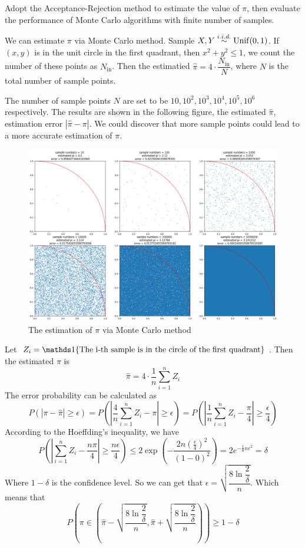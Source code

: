 \begin{homeworkProblem}

Adopt the Acceptance-Rejection method to estimate the value of $\pi$, then evaluate the performance of Monte Carlo algorithms with finite number of samples.

\solution

We can estimate $\pi$ via Monte Carlo method. Sample $X, Y\stackrel{i.i.d.}{\sim}\operatorname{Unif}(0,1)$. If $(x,y)$ is in the unit circle in the first quadrant, then $x^2+y^2\leq 1$, we count the number of these points as $N_{\text{in}}$. Then the estimatied $\hat{\pi}=4\cdot\dfrac{N_{\text{in}}}{N}$, where $N$ is the total number of sample points.

The number of sample points $N$ are set to be $10, 10^2, 10^3, 10^4, 10^5, 10^6$ respectively. The results are shown in the following figure, the estimated $\hat{\pi}$, estimation error $|\hat{\pi}-\pi|$. We could discover that more sample points could lead to a more accurate estimation of $\pi$.

\begin{figure}[h]
    \centering
    \includegraphics[width=\textwidth]{./figure/p4/simulated_result.png}
    \caption{The estimation of $\pi$ via Monte Carlo method}
\end{figure}

Let $Z_i=\I\{\text{The i-th sample is in the circle of the first quadrant}\}$. Then the estimated $\pi$ is
$$\hat{\pi}=4\cdot\dfrac{1}{n}\sum_{i=1}^n Z_i$$
The error probability can be calculated as
$$P\left(|\pi-\hat{\pi}|\geq \epsilon \right) = P\left(\left|\dfrac{4}{n}\sum_{i=1}^n Z_i-\pi\right|\geq\epsilon\right)=P\left(\left|\dfrac{1}{n}\sum_{i=1}^n Z_i-\dfrac{\pi}{4}\right|\geq\dfrac{\epsilon}{4}\right)$$
According to the Hoeffding's inequality, we have
$$P\left(\left|\sum_{i=1}^n Z_i-\dfrac{n\pi}{4}\right|\geq\dfrac{n\epsilon}{4}\right)\leq 2\exp\left(-\dfrac{2n\left(\frac{\epsilon}{4}\right)^2}{(1-0)^2}\right)=2e^{-\frac{1}{8}n\epsilon^2}=\delta$$
Where $1-\delta$ is the confidence level. So we can get that $\epsilon = \sqrt{\dfrac{8\ln\dfrac{2}{\delta}}{n}}$. Which means that
$$P\left(\pi\in\left(\hat{\pi}-\sqrt{\dfrac{8\ln\dfrac{2}{\delta}}{n}}, \hat{\pi}+\sqrt{\dfrac{8\ln\dfrac{2}{\delta}}{n}}\right)\right)\geq 1-\delta$$


\end{homeworkProblem}
